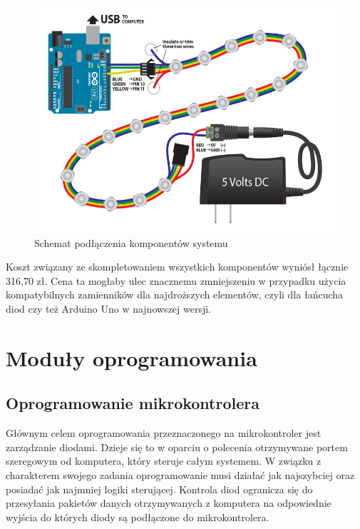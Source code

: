 \documentclass[12pt]{report}
\begin{document}
\begin{figure}[h]
\centering
\includegraphics[width=\textwidth]{../resources/wiring.png}
\caption[Schemat podłączenia komponentów systemu]{Schemat podłączenia komponentów systemu \cite{schemat}}
\label{schemat}
\end{figure}
		
Koszt związany ze skompletowaniem wszystkich komponentów wyniósł łącznie 316,70 zł. Cena ta mogłaby ulec znacznemu zmniejszeniu w przypadku użycia kompatybilnych zamienników dla najdroższych elementów, czyli dla łańcucha diod czy też Arduino Uno w najnowszej wersji.


\section{Moduły oprogramowania}

\subsection{Oprogramowanie mikrokontrolera}

Głównym celem oprogramowania przeznaczonego na mikrokontroler jest zarządza\-nie diodami. Dzieje się to w oparciu o polecenia otrzymywane portem szeregowym od komputera, który steruje całym systemem. W związku z charakterem swojego zadania oprogramowanie musi działać jak najszybciej oraz posiadać jak najmniej logiki sterującej. Kontrola diod ogranicza się do przesyłania pakietów danych otrzymywanych z komputera na odpowiednie wyjścia do których diody są podłączone do mikrokontrolera. 
\end{document}

